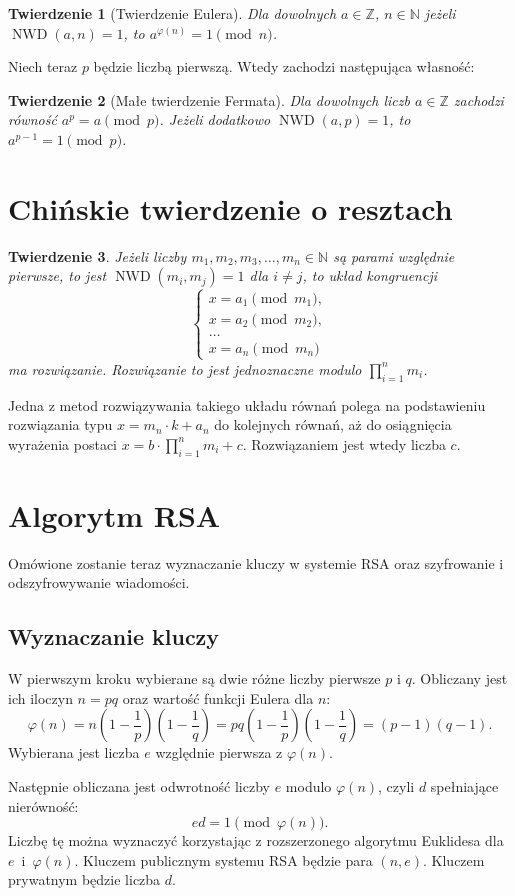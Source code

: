 \documentclass[12pt,twoside,a4]{mwbk}
\newtheorem{twierdzenie}{Twierdzenie}[chapter]
\theoremstyle{definition}
\DeclareMathOperator{\NWD}{NWD}
\begin{document}
\begin{twierdzenie}[Twierdzenie Eulera]{\cite{fermat}}
Dla dowolnych $a \in \mathbb{Z}$, $n \in \mathbb{N}$ jeżeli \\
$\NWD(a,n) = 1$, to $a^{\varphi(n)} = 1 \pmod{n}$.
\end{twierdzenie}

Niech teraz $p$ będzie liczbą pierwszą. Wtedy zachodzi następująca własność:
\begin{twierdzenie}[Małe twierdzenie Fermata]{\cite{fermat}}
Dla dowolnych liczb $a \in \mathbb{Z}$ zachodzi równość $a^p = a \pmod{p}$. Jeżeli dodatkowo $\NWD(a,p) = 1$, to $a^{p-1} = 1 \pmod{p}$.
\end{twierdzenie}


\section{Chińskie twierdzenie o resztach}
\begin{twierdzenie}{\cite{handbook}}
Jeżeli liczby $m_1,m_2,m_3,\ldots,m_n \in \mathbb{N}$ są parami względnie pierwsze, to jest $\NWD(m_i,m_j)=1$ dla $i\neq j$, to układ kongruencji
\[ \left\{ \begin{array}{c}
x = a_1 \pmod{m_1}, \\
x = a_2 \pmod{m_2}, \\
\ldots \\
x = a_n \pmod{m_n}
\end{array} \right. \]
ma rozwiązanie. Rozwiązanie to jest jednoznaczne modulo $\prod_{i=1}^n m_i$.
\end{twierdzenie}
Jedna z metod rozwiązywania takiego układu równań polega na podstawieniu rozwiązania typu $x = m_n \cdot k + a_n$ do kolejnych równań, aż do osiągnięcia wyrażenia postaci $x = b \cdot \prod_{i=1}^n m_i + c$. Rozwiązaniem jest wtedy liczba $c$.


\section{Algorytm RSA}
Omówione zostanie teraz wyznaczanie kluczy w systemie RSA oraz szyfrowanie i odszyfrowywanie wiadomości.

\subsection{Wyznaczanie kluczy}
W pierwszym kroku wybierane są dwie różne liczby pierwsze $p$ i $q$. Obliczany jest ich iloczyn $n = pq$ oraz wartość funkcji Eulera dla $n$:
\[ \varphi(n) = n \left( 1 - \frac{1}{p} \right) \left( 1 - \frac{1}{q} \right) = pq \left( 1 - \frac{1}{p} \right) \left( 1 - \frac{1}{q} \right) = (p-1)(q-1). \]
Wybierana jest liczba $e$ względnie pierwsza z $\varphi(n)$. \\ \par
Następnie obliczana jest odwrotność liczby $e$ modulo $\varphi(n)$, czyli $d$ spełniające nierówność:
\[ ed = 1 \pmod{\varphi(n)}. \]
Liczbę tę można wyznaczyć korzystając z rozszerzonego algorytmu Euklidesa dla $e$~i~$\varphi(n)$. 
Kluczem publicznym systemu RSA będzie para $(n, e)$. Kluczem prywatnym będzie liczba $d$.
\end{document}
